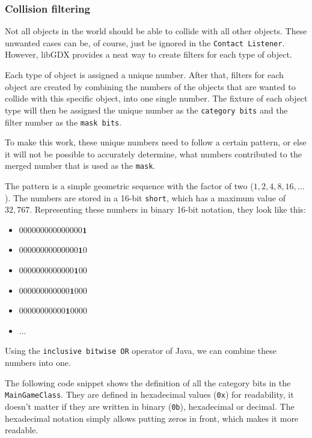 \documentclass[12p]{article}
\begin{document}

\subsubsection{Collision filtering}

Not all objects in the world should be able to collide with all other objects. These unwanted cases can be, of course, just be ignored in the \texttt{Contact Listener}. However, libGDX provides a neat way to create filters for each type of object.

Each type of object is assigned a unique number. After that, filters for each object are created by combining the numbers of the objects that are wanted to collide with this specific object, into one single number. The fixture of each object type will then be assigned the unique number as the \texttt{category bits} and the filter number as the \texttt{mask bits}.

To make this work, these unique numbers need to follow a certain pattern, or else it will not be possible to accurately determine, what numbers contributed to the merged number that is used as the \texttt{mask}.

The pattern is a simple geometric sequence with the factor of two ($1, 2, 4, 8, 16, ...$). The numbers are stored in a 16-bit \texttt{short}, which has a maximum value of $32,767$. Representing these numbers in binary 16-bit notation, they look like this:

\begin{itemize}[leftmargin=*]
  \itemsep-0.75em 
  \item[] $000000000000000\mathbf{1}$
  \item[] $00000000000000\mathbf{1}0$
  \item[] $0000000000000\mathbf{1}00$
  \item[] $000000000000\mathbf{1}000$
  \item[] $00000000000\mathbf{1}0000$
  \item[] $...$
\end{itemize}

Using the \texttt{inclusive bitwise OR} operator \cite{bitwiseOROperator} of Java, we can combine these numbers into one.

The following code snippet shows the definition of all the category bits in the \texttt{MainGameClass}. They are defined in hexadecimal values (\texttt{0x}) for readability, it doesn't matter if they are written in binary (\texttt{0b}), hexadecimal or decimal. The hexadecimal notation simply allows putting zeros in front, which makes it more readable.
\end{document}
